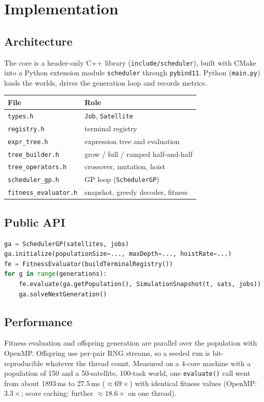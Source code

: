 \chapter{Implementation}
\label{ch:impl}

\section{Architecture}
The core is a header-only C++ library (\texttt{include/scheduler}), built with CMake
into a Python extension module \texttt{scheduler} through \texttt{pybind11}.
Python (\texttt{main.py}) loads the worlds, drives the generation loop and records metrics.
\begin{center}
\begin{tabular}{ll}
\toprule
File & Role\\
\midrule
\texttt{types.h} & \texttt{Job}, \texttt{Satellite}\\
\texttt{registry.h} & terminal registry\\
\texttt{expr\_tree.h} & expression tree and evaluation\\
\texttt{tree\_builder.h} & grow / full / ramped half-and-half\\
\texttt{tree\_operators.h} & crossover, mutation, hoist\\
\texttt{scheduler\_gp.h} & GP loop (\texttt{SchedulerGP})\\
\texttt{fitness\_evaluator.h} & snapshot, greedy decoder, fitness\\
\bottomrule
\end{tabular}
\end{center}

\section{Public API}
\begin{lstlisting}[language=Python]
ga = SchedulerGP(satellites, jobs)
ga.initialize(populationSize=..., maxDepth=..., hoistRate=...)
fe = FitnessEvaluator(buildTerminalRegistry())
for g in range(generations):
    fe.evaluate(ga.getPopulation(), SimulationSnapshot(t, sats, jobs))
    ga.solveNextGeneration()
\end{lstlisting}

\section{Performance}
Fitness evaluation and offspring generation are parallel over the population
with OpenMP. Offspring use per-pair RNG streams, so a seeded run is
bit-reproducible whatever the thread count. Measured on a 4-core machine with a
population of 150 and a 50-satellite, 100-task world, one \texttt{evaluate()}
call went from about 1893\,ms to 27.5\,ms ($\approx 69\times$) with identical
fitness values (OpenMP: $3.3\times$; score caching: further $\approx 18.6\times$ on one thread).

